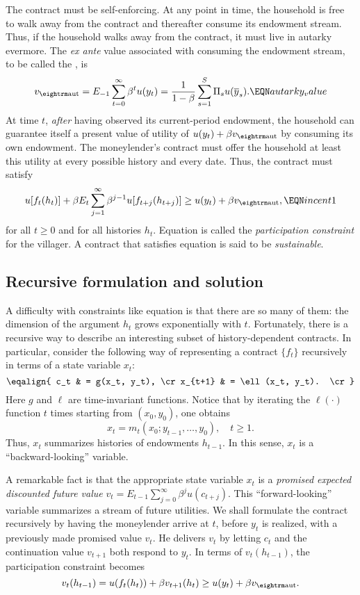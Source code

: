   The contract must be self-enforcing.  At any point in time, the
household is free to walk away from the contract and thereafter consume
its endowment stream.  Thus, if the household walks away from the contract,
it must live in autarky evermore.  The {\it ex ante\/} value associated
with consuming the endowment stream, to be called the , is
$$ v_{\rm aut} = E_{-1} \sum_{t=0}^\infty \beta^t u(y_t) =
 {1 \over 1-\beta}\sum_{s=1}^S \Pi_s u(\overline y_s).       \EQN autarky_value $$
%
At  time $t$, {\it after\/} having observed its current-period endowment,
the household can guarantee itself a present value of utility of
$u(y_t) + \beta v_{\rm aut}$ by consuming its own endowment.  The
moneylender's contract must offer the household at least this utility
at every possible history and every date.  Thus, the contract must
satisfy
$$  u[f_t(h_t)] + \beta E_t \sum_{j=1}^\infty \beta^{j-1} u[f_{t+j} (h_{t+j})]
    \geq u(y_t) + \beta v_{\rm aut} , \EQN incent1 $$
for all $t \geq 0$ and for all histories $h_t$.  Equation
 is called the  %
{\it participation constraint\/} for the villager.  A contract that
satisfies equation  is said to be {\it sustainable}.

\subsection{Recursive formulation and solution}

 A difficulty with constraints like equation  is
that there are so many of them: the dimension of the argument
$h_t$ grows  exponentially with $t$. Fortunately,
 there is a recursive way to describe an interesting subset of history-dependent contracts.
In particular, consider the following way of representing a contract $\{f_t\}$
recursively in terms of a state variable $x_t$:
$$\eqalign{ c_t & = g(x_t, y_t), \cr
            x_{t+1} & = \ell(x_t, y_t). \cr}$$
Here $g$ and $\ell$ are time-invariant functions.
Notice that by iterating the $\ell(\cdot)$ function $t$ times
starting from $(x_0, y_0)$, one obtains
$$ x_t = m_t(x_0; y_{t-1}, \ldots , y_0), \quad t \geq 1. $$
Thus, $x_t$ summarizes histories of endowments $h_{t-1}$.  In this sense,
$x_t$ is a ``backward-looking'' variable.

A remarkable fact is  that the appropriate state variable $x_t$ is
 a {\it promised expected discounted future value} $v_t =
E_{t-1} \sum_{j=0}^\infty \beta^j u(c_{t+j})$.
  This ``forward-looking'' variable summarizes a stream of future utilities.
We shall  formulate the contract recursively by having the
moneylender arrive at $t$, before $y_t$ is realized,
 with a previously made promised value $v_t$. He delivers $v_t$ by
letting $c_t$ and the continuation value $v_{t+1}$ both
respond to $y_t$.  In terms of $v_t(h_{t-1})$, the participation constraint
 becomes
$$  v_t(h_{t-1}) = u (f_t(h_t)) + \beta v_{t+1}(h_t) \geq  u(y_t) + \beta v_{\rm aut}. $$

